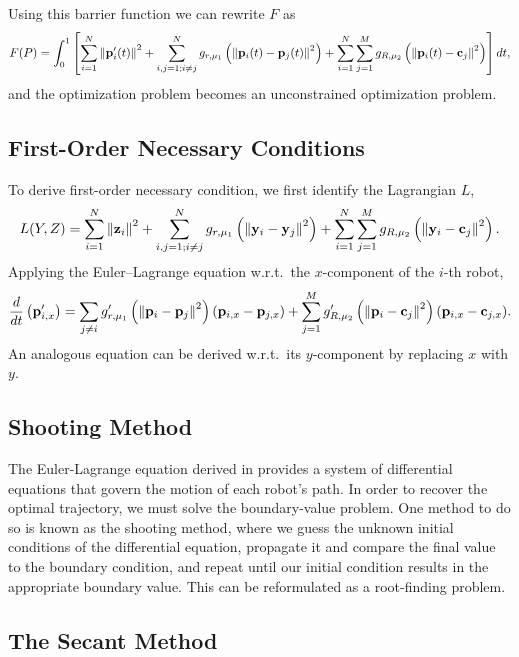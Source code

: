 \documentclass[11pt]{article}
\begin{document}
Using this barrier function we can rewrite \(F\) as
\begin{equation}
    F(P) = \int_0^1 \left[ \sum_{i=1}^{N} \left\lVert \mathbf{p}'_i(t) \right\rVert^2 + \sum_{i,j = 1; i \neq j}^{N} g_{r,\mu_1}\left( \left\lVert \mathbf{p}_i(t) - \mathbf{p}_j(t) \right\rVert^2 \right) + \sum_{i=1}^{N} \sum_{j=1}^{M} g_{R,\mu_2}\left( \left\lVert \mathbf{p}_i(t) - \mathbf{c}_j \right\rVert^2 \right) \right] dt,
\end{equation}
and the optimization problem becomes an unconstrained optimization problem.

\subsection{First-Order Necessary Conditions}

To derive first-order necessary condition, we first identify the Lagrangian \(L\),
\begin{equation}
    L(Y,Z) = \sum_{i=1}^{N} \left\lVert \mathbf{z}_i \right\rVert^2 + \sum_{i,j = 1; i \neq j}^{N} g_{r,\mu_1}\left( \left\lVert \mathbf{y}_i - \mathbf{y}_j \right\rVert^2 \right) + \sum_{i=1}^{N} \sum_{j=1}^{M} g_{R,\mu_2}\left( \left\lVert \mathbf{y}_i - \mathbf{c}_j \right\rVert^2 \right).
\end{equation}
Applying the Euler--Lagrange equation w.r.t.\ the \(x\)-component of the \(i\)-th robot,
\begin{equation}
    \frac{d}{dt}\left(\mathbf{p}'_{i,x}\right) = \sum_{j \neq i} g'_{r,\mu_1}\left( \left\lVert \mathbf{p}_i - \mathbf{p}_j \right\rVert^2 \right) (\mathbf{p}_{i,x} - \mathbf{p}_{j,x}) + \sum_{j=1}^{M} g'_{R,\mu_2}\left( \left\lVert \mathbf{p}_i - \mathbf{c}_j \right\rVert^2 \right) (\mathbf{p}_{i,x} - \mathbf{c}_{j,x}).
    \label{eq:EL}
\end{equation}
An analogous equation can be derived w.r.t.\ its \(y\)-component by replacing \(x\) with \(y\).

\subsection{Shooting Method}

The Euler-Lagrange equation derived in  provides a system of differential equations that govern the motion of each robot's path. In order to recover the optimal trajectory, we must solve the boundary-value problem. One method to do so is known as the shooting method, where we guess the unknown initial conditions of the differential equation, propagate it and compare the final value to the boundary condition, and repeat until our initial condition results in the appropriate boundary value. This can be reformulated as a root-finding problem.

\subsection{The Secant Method}
\end{document}
